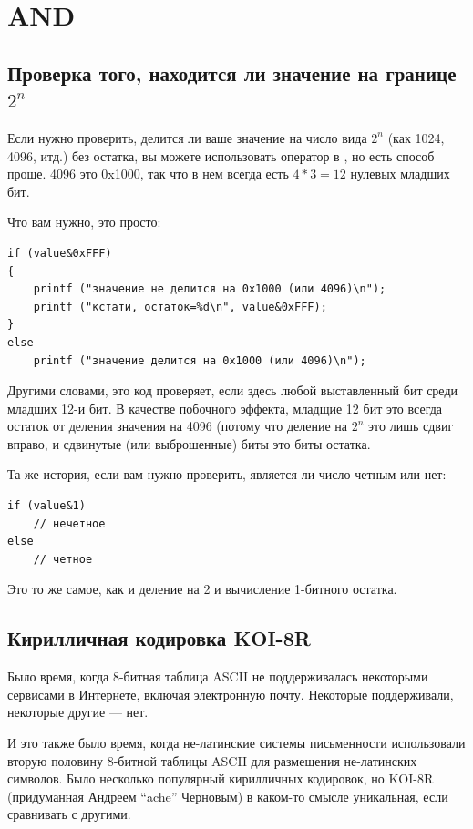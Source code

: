 \section{AND}

\subsection{Проверка того, находится ли значение на границе $2^n$}

Если нужно проверить, делится ли ваше значение на число вида 
$2^n$ (как 1024, 4096, итд.) без остатка,
вы можете использовать оператор \TT{\%} в \CCpp, но есть способ проще.
4096 это 0x1000, так что в нем всегда есть $4*3=12$ нулевых младших бит.

Что вам нужно, это просто:

\begin{lstlisting}[style=customc]
if (value&0xFFF)
{
	printf ("значение не делится на 0x1000 (или 4096)\n");
	printf ("кстати, остаток=%d\n", value&0xFFF);
}
else
	printf ("значение делится на 0x1000 (или 4096)\n");
\end{lstlisting}

Другими словами, это код проверяет, если здесь любой выставленный бит среди младших 12-и бит.
В качестве побочного эффекта, младщие 12 бит это всегда остаток от деления значения на 4096 (потому что деление на $2^n$
это лишь сдвиг вправо, и сдвинутые (или выброшенные) биты это биты остатка.

Та же история, если вам нужно проверить, является ли число четным или нет:

\begin{lstlisting}[style=customc]
if (value&1)
	// нечетное
else
	// четное
\end{lstlisting}

Это то же самое, как и деление на 2 и вычисление 1-битного остатка.

\subsection{Кирилличная кодировка KOI-8R}

Было время, когда 8-битная таблица \ac{ASCII} не поддерживалась некоторыми сервисами в Интернете, включая электронную почту.
Некоторые поддерживали, некоторые другие --- нет.

И это также было время, когда не-латинские системы письменности использовали вторую половину 8-битной таблицы ASCII
для размещения не-латинских символов.
Было несколько популярный кирилличных кодировок, но KOI-8R (придуманная Андреем ``ache'' Черновым)
в каком-то смысле уникальная, если сравнивать с другими.

